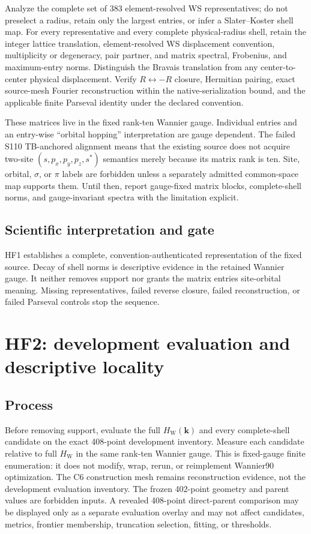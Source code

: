 \documentclass[11pt]{report}
\begin{document}
Analyze the complete set of 383 element-resolved WS representatives; do not preselect a
radius, retain only the largest entries, or infer a Slater--Koster shell map.  For every
representative and every complete physical-radius shell, retain the integer lattice
translation, element-resolved WS displacement convention, multiplicity or degeneracy,
pair partner, and matrix spectral, Frobenius, and maximum-entry norms.  Distinguish the
Bravais translation from any center-to-center physical displacement.  Verify
$R\leftrightarrow -R$ closure, Hermitian pairing, exact source-mesh Fourier
reconstruction within the native-serialization bound, and the applicable finite
Parseval identity under the declared convention.

These matrices live in the fixed rank-ten Wannier gauge.  Individual entries and an
entry-wise ``orbital hopping'' interpretation are gauge dependent.  The failed S110
TB-anchored alignment means that the existing source does not acquire two-site
$(s,p_x,p_y,p_z,s^*)$ semantics merely because its matrix rank is ten.  Site, orbital,
$\sigma$, or $\pi$ labels are forbidden unless a separately admitted common-space map
supports them.  Until then, report gauge-fixed matrix blocks, complete-shell norms, and
gauge-invariant spectra with the limitation explicit.

\section{Scientific interpretation and gate}

HF1 establishes a complete, convention-authenticated representation of the fixed
source.  Decay of shell norms is descriptive evidence in the retained Wannier gauge.
It neither removes support nor grants the matrix entries site-orbital meaning.  Missing
representatives, failed reverse closure, failed reconstruction, or failed Parseval
controls stop the sequence.

\chapter{HF2: development evaluation and descriptive locality}

\section{Process}

Before removing support, evaluate the full $H_{\mathrm{W}}(\mathbf{k})$ and every
complete-shell candidate on the exact 408-point development inventory.  Measure each
candidate relative to full $H_{\mathrm{W}}$ in the same rank-ten Wannier gauge.  This is
fixed-gauge finite enumeration: it does not modify, wrap, rerun, or reimplement Wannier90
optimization.  The C6 construction mesh remains reconstruction evidence, not the development evaluation
inventory.  The frozen 402-point geometry and parent values are forbidden inputs.  A
revealed 408-point direct-parent comparison may be displayed only as a separate
evaluation overlay and may not affect candidates, metrics, frontier membership,
truncation selection, fitting, or thresholds.
\end{document}

